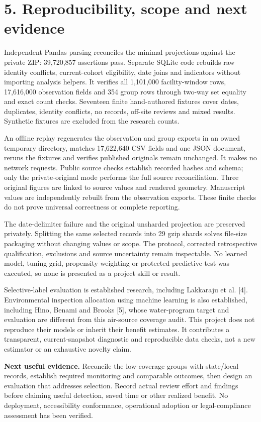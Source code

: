 \documentclass[10pt,letterpaper]{article}
\begin{document}
\newpage
\section*{5. Reproducibility, scope and next evidence}
Independent Pandas parsing reconciles the minimal projections against the private ZIP: 39,720,857 assertions pass. Separate SQLite code rebuilds raw identity conflicts, current-cohort eligibility, date joins and indicators without importing analysis helpers. It verifies all 1,101,000 facility-window rows, 17,616,000 observation fields and 354 group rows through two-way set equality and exact count checks. Seventeen finite hand-authored fixtures cover dates, duplicates, identity conflicts, no records, off-site reviews and mixed results. Synthetic fixtures are excluded from the research counts.

An offline replay regenerates the observation and group exports in an owned temporary directory, matches 17,622,640 CSV fields and one JSON document, reruns the fixtures and verifies published originals remain unchanged. It makes no network requests. Public source checks establish recorded hashes and schema; only the private-original mode performs the full source reconciliation. Three original figures are linked to source values and rendered geometry. Manuscript values are independently rebuilt from the observation exports. These finite checks do not prove universal correctness or complete reporting.

The date-delimiter failure and the original unsharded projection are preserved privately. Splitting the same selected records into 29 gzip shards solves file-size packaging without changing values or scope. The protocol, corrected retrospective qualification, exclusions and source uncertainty remain inspectable. No learned model, tuning grid, propensity weighting or protected predictive test was executed, so none is presented as a project skill or result.

Selective-label evaluation is established research, including Lakkaraju et al. [4]. Environmental inspection allocation using machine learning is also established, including Hino, Benami and Brooks [5], whose water-program target and evaluation are different from this air-source coverage audit. This project does not reproduce their models or inherit their benefit estimates. It contributes a transparent, current-snapshot diagnostic and reproducible data checks, not a new estimator or an exhaustive novelty claim.

\textbf{Next useful evidence.} Reconcile the low-coverage groups with state/local records, establish required monitoring and comparable outcomes, then design an evaluation that addresses selection. Record actual review effort and findings before claiming useful detection, saved time or other realized benefit. No deployment, accessibility conformance, operational adoption or legal-compliance assessment has been verified.
\end{document}
